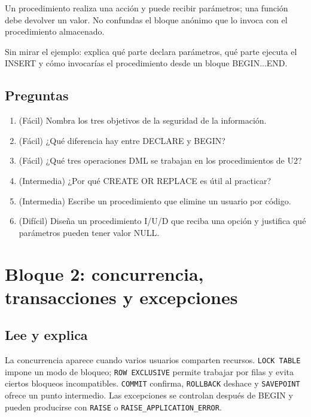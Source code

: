 \documentclass[11pt,a4paper]{article}
\newif\ifmostrarSoluciones
\newcommand{\campo}[1]{\texttt{#1}}
\begin{document}
\begin{clave}Un procedimiento realiza una acción y puede recibir parámetros; una función debe
devolver un valor. No confundas el bloque anónimo que lo invoca con el procedimiento almacenado.\end{clave}
\begin{pausa}
Sin mirar el ejemplo: explica qué parte declara parámetros, qué parte ejecuta el INSERT y cómo
invocarías el procedimiento desde un bloque BEGIN...END.
\end{pausa}

\subsection{Preguntas}
\begin{enumerate}[leftmargin=*]
\item (Fácil) Nombra los tres objetivos de la seguridad de la información.
\item (Fácil) ¿Qué diferencia hay entre DECLARE y BEGIN?
\item (Fácil) ¿Qué tres operaciones DML se trabajan en los procedimientos de U2?
\item (Intermedia) ¿Por qué CREATE OR REPLACE es útil al practicar?
\item (Intermedia) Escribe un procedimiento que elimine un usuario por código.
\item (Difícil) Diseña un procedimiento I/U/D que reciba una opción y justifica qué parámetros pueden tener valor NULL.
\end{enumerate}
\ifmostrarSoluciones\begin{clave}\textbf{Pauta breve:} confidencialidad, disponibilidad e integridad. DECLARE prepara variables y BEGIN ejecuta. DML: INSERT, UPDATE y DELETE. CREATE OR REPLACE recompila y reemplaza la versión anterior. El procedimiento I/U/D debe validar la opción antes de ejecutar la operación.\end{clave}\fi

\section{Bloque 2: concurrencia, transacciones y excepciones}
\subsection{Lee y explica}
La concurrencia aparece cuando varios usuarios comparten recursos. \campo{LOCK TABLE} impone un
modo de bloqueo; \campo{ROW EXCLUSIVE} permite trabajar por filas y evita ciertos bloqueos
incompatibles. \campo{COMMIT} confirma, \campo{ROLLBACK} deshace y \campo{SAVEPOINT} ofrece un
punto intermedio. Las excepciones se controlan después de BEGIN y pueden producirse con \campo{RAISE}
o \campo{RAISE\_APPLICATION\_ERROR}.
\end{document}
